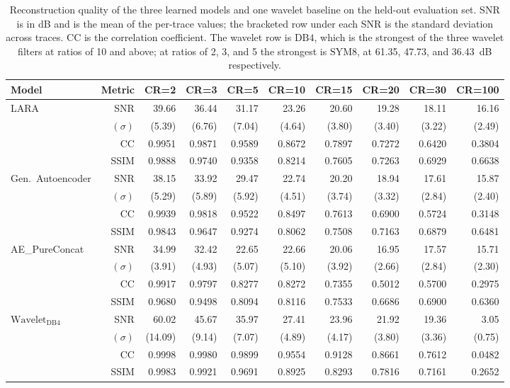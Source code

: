 \documentclass[fleqn,10pt]{wlscirep}
\begin{document}
\begin{table}[!t]
\centering
\small
\caption{Reconstruction quality of the three learned models and one wavelet baseline on the held-out evaluation set. SNR is in dB and is the mean of the per-trace values; the bracketed row under each SNR is the standard deviation across traces. CC is the correlation coefficient. The wavelet row is $\text{DB4}$, which is the strongest of the three wavelet filters at ratios of 10 and above; at ratios of 2, 3, and 5 the strongest is $\text{SYM8}$, at 61.35, 47.73, and 36.43~dB respectively.}
\label{tab:main-results}
\begin{tabular}{lrrrrrrrrr}
\toprule
Model & Metric & CR=2 & CR=3 & CR=5 & CR=10 & CR=15 & CR=20 & CR=30 & CR=100 \\
\midrule
\multirow{2}{*}{LARA} & SNR & 39.66 & 36.44 & 31.17 & 23.26 & 20.60 & 19.28 & 18.11 & 16.16 \\
 & $(\sigma)$ & (5.39) & (6.76) & (7.04) & (4.64) & (3.80) & (3.40) & (3.22) & (2.49) \\
 & CC & 0.9951 & 0.9871 & 0.9589 & 0.8672 & 0.7897 & 0.7272 & 0.6420 & 0.3804 \\
 & SSIM & 0.9888 & 0.9740 & 0.9358 & 0.8214 & 0.7605 & 0.7263 & 0.6929 & 0.6638 \\
\addlinespace
Gen.\ Autoencoder & SNR & 38.15 & 33.92 & 29.47 & 22.74 & 20.20 & 18.94 & 17.61 & 15.87 \\
 & $(\sigma)$ & (5.29) & (5.89) & (5.92) & (4.51) & (3.74) & (3.32) & (2.84) & (2.40) \\
 & CC & 0.9939 & 0.9818 & 0.9522 & 0.8497 & 0.7613 & 0.6900 & 0.5724 & 0.3148 \\
 & SSIM & 0.9843 & 0.9647 & 0.9274 & 0.8062 & 0.7508 & 0.7163 & 0.6879 & 0.6481 \\
\addlinespace
AE\_PureConcat & SNR & 34.99 & 32.42 & 22.65 & 22.66 & 20.06 & 16.95 & 17.57 & 15.71 \\
 & $(\sigma)$ & (3.91) & (4.93) & (5.07) & (5.10) & (3.92) & (2.66) & (2.84) & (2.30) \\
 & CC & 0.9917 & 0.9797 & 0.8277 & 0.8272 & 0.7355 & 0.5012 & 0.5700 & 0.2975 \\
 & SSIM & 0.9680 & 0.9498 & 0.8094 & 0.8116 & 0.7533 & 0.6686 & 0.6900 & 0.6360 \\
\addlinespace
$\text{Wavelet}_{\text{DB4}}$ & SNR & 60.02 & 45.67 & 35.97 & 27.41 & 23.96 & 21.92 & 19.36 & 3.05 \\
 & $(\sigma)$ & (14.09) & (9.14) & (7.07) & (4.89) & (4.17) & (3.80) & (3.36) & (0.75) \\
 & CC & 0.9998 & 0.9980 & 0.9899 & 0.9554 & 0.9128 & 0.8661 & 0.7612 & 0.0482 \\
 & SSIM & 0.9983 & 0.9921 & 0.9691 & 0.8925 & 0.8293 & 0.7816 & 0.7161 & 0.2652 \\
\bottomrule
\end{tabular}
\end{table}
\end{document}

